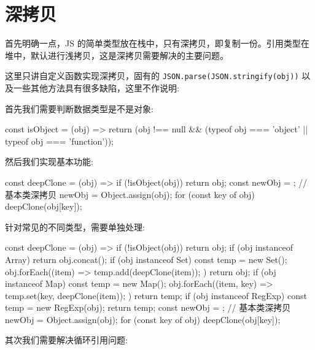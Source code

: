 \section{深拷贝}

首先明确一点，JS 的简单类型放在栈中，只有深拷贝，即复制一份。引用类型在堆中，默认进行浅拷贝，这是深拷贝需要解决的主要问题。

这里只讲自定义函数实现深拷贝，固有的 \texttt{JSON.parse(JSON.stringify(obj))} 以及一些其他方法具有很多缺陷，这里不作说明:

首先我们需要判断数据类型是不是对象:

\begin{JavaScript}
const isObject = (obj) => {
  return (obj !== null && (typeof obj === 'object' || typeof obj === 'function'));
}
\end{JavaScript}

然后我们实现基本功能:

\begin{JavaScript}
const deepClone = (obj) => {
  if (!isObject(obj))
    return obj;
  const newObj = {};
  // 基本类深拷贝
  newObj = Object.assign(obj);
  for (const key of obj) {
    deepClone(obj[key]);
  }
}
\end{JavaScript}

针对常见的不同类型，需要单独处理:

\begin{JavaScript}
const deepClone = (obj) => {
  if (!isObject(obj))
    return obj;
  if (obj instanceof Array) {
    return obj.concat();
  }
  if (obj instanceof Set) {
    const temp = new Set();
    obj.forEach((item) => {
      temp.add(deepClone(item));
    })
    return obj;
  }
  if (obj instanceof Map) {
    const temp = new Map();
    obj.forEach((item, key) => {
      temp.set(key, deepClone(item));
    })
    return temp;
  }
  if (obj instanceof RegExp) {
    const temp = new RegExp(obj);
    return temp;
  }
  const newObj = {};
  // 基本类深拷贝
  newObj = Object.assign(obj);
  for (const key of obj) {
    deepClone(obj[key]);
  }
}
\end{JavaScript}

其次我们需要解决循环引用问题:

